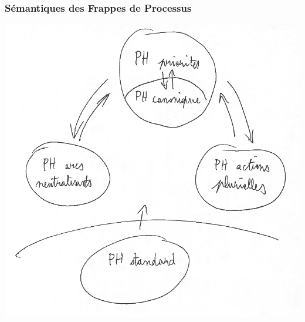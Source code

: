 
\begin{frame}[c]
  \frametitle{Sémantiques des Frappes de Processus}

\centering
\includegraphics[height=.9\textheight]{figs/PH.png}

\end{frame}

